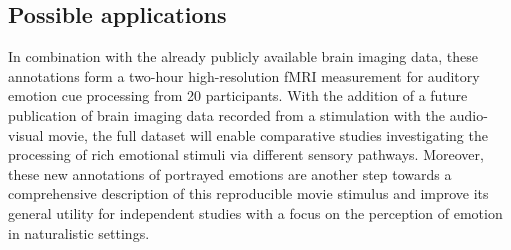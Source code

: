 \subsection*{Possible applications}

In combination with the already publicly available brain imaging data, these
annotations form a two-hour high-resolution fMRI measurement for auditory
emotion cue processing from 20 participants. With the addition of a future
publication of brain imaging data recorded from a stimulation with the
audio-visual movie, the full dataset will enable comparative studies
investigating the processing of rich emotional stimuli via different sensory
pathways. Moreover, these new annotations of portrayed emotions are another
step towards a comprehensive description of this reproducible movie
stimulus\cite{HBI+14} and improve its general utility for independent studies
with a focus on the perception of emotion in naturalistic settings.
